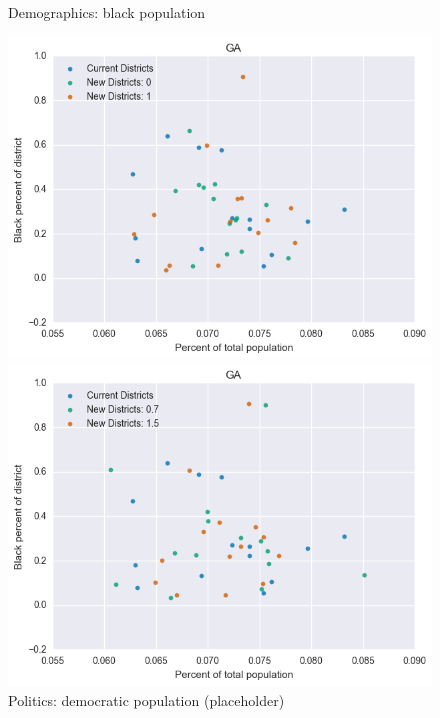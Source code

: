 \begin{figure}[htb!] \centering
\caption{ Demographics: black population }
\includegraphics[width=4.5in]{../analysis/GA/analysis_scatter.png}
\caption{ Politics: democratic population (placeholder)}
\includegraphics[width=4.5in]{../analysis/GA/analysis_scatter2.png}
\end{figure}

\clearpage
\newpage

